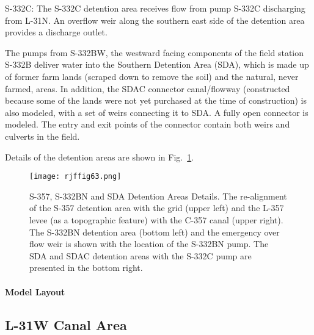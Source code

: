 S-332C: The S-332C detention area receives flow from pump S-332C discharging from L-31N. An overflow weir along the southern east side of the detention area provides a discharge outlet.

The pumps from S-332BW, the westward facing components of the field station S-332B deliver water into the Southern Detention Area (SDA), which is made up of former farm lands (scraped down to remove the soil) and the natural, never farmed, areas.
In addition, the SDAC connector canal/flowway (constructed because some of the lands were not yet purchased at the time of construction) is also modeled, with a set of weirs connecting it to SDA. A fully open connector is modeled.
The entry and exit points of the connector contain both weirs and culverts in the field.

Details of the detention areas are shown in Fig.~\ref{fig:rjffig63}.

\begin{figure}[!h]
  \begin{center}
  \texttt{[image: rjffig63.png]}
  \caption[S-357, S-332BN and SDA Detention Areas Details.]{S-357, S-332BN and SDA Detention Areas Details. The re-alignment of the S-357 detention area with the grid (upper left) and the L-357 levee (as a topographic feature) with the C-357 canal (upper right). The S-332BN detention area (bottom left) and the emergency over  flow weir is shown with the location of the S-332BN pump. The SDA and SDAC detention areas with the S-332C pump are presented in the bottom right.}
  \label{fig:rjffig63}
  \end{center}
\end{figure}


\paragraph{Model Layout}




\clearpage
\subsection{L-31W Canal Area}

